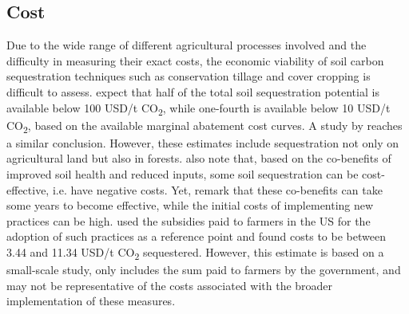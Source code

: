 \subsection*{Cost}
Due to the wide range of different agricultural processes involved and the difficulty in measuring their exact costs, the economic viability of soil carbon sequestration techniques such as conservation tillage and cover cropping is difficult to assess. \textcite{Bossio2020TheSolutions} expect that half of the total soil sequestration potential is available below 100 USD/t CO\textsubscript{2}, while one-fourth is available below 10 USD/t CO\textsubscript{2}, based on the available marginal abatement cost curves. A study by \textcite{McKinsey2009PathwaysEconomy} reaches a similar conclusion. However, these estimates include sequestration not only on agricultural land but also in forests. \textcite{Bossio2020TheSolutions} also note that, based on the co-benefits of improved soil health and reduced inputs, some soil sequestration can be cost-effective, i.e. have negative costs. Yet, \textcite{Zoebisch2022SoilMoonshot} remark that these co-benefits can take some years to become effective, while the initial costs of implementing new practices can be high.
\textcite{Chambers2016SoilInitiative} used the subsidies paid to farmers in the US for the adoption of such practices as a reference point and found costs to be between 3.44 and 11.34 USD/t CO\textsubscript{2} sequestered. However, this estimate is based on a small-scale study, only includes the sum paid to farmers by the government, and may not be representative of the costs associated with the broader implementation of these measures.

